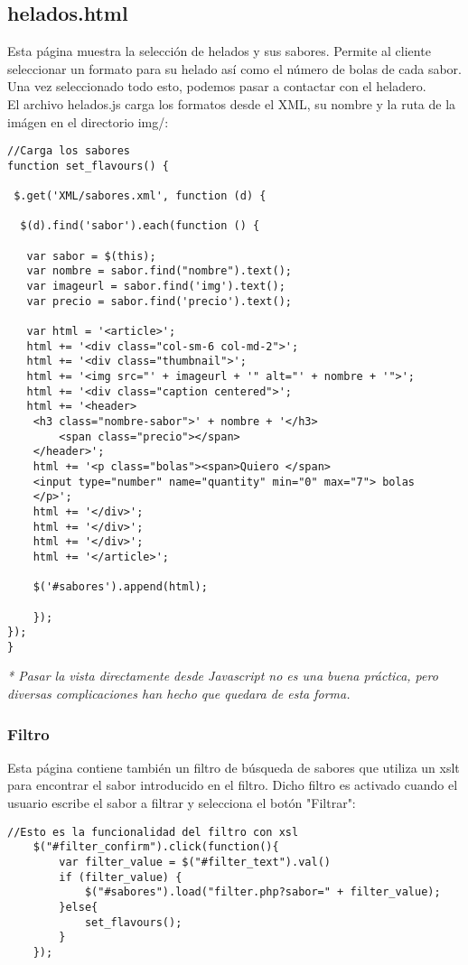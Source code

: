 \documentclass[11pt,a4paper]{article}
\begin{document}
\subsection{helados.html}
Esta página muestra la selección de helados y sus sabores. Permite al cliente seleccionar un formato para su helado así como el número de bolas de cada sabor. Una vez seleccionado todo esto, podemos pasar a contactar con el heladero.\\
El archivo helados.js carga los formatos desde el XML, su nombre y la ruta de la imágen en el directorio img/:\\
\lstset{language=Java}
\begin{lstlisting}
//Carga los sabores
function set_flavours() {

 $.get('XML/sabores.xml', function (d) {

  $(d).find('sabor').each(function () {

   var sabor = $(this);
   var nombre = sabor.find("nombre").text();
   var imageurl = sabor.find('img').text();
   var precio = sabor.find('precio').text();

   var html = '<article>';
   html += '<div class="col-sm-6 col-md-2">';
   html += '<div class="thumbnail">';
   html += '<img src="' + imageurl + '" alt="' + nombre + '">';
   html += '<div class="caption centered">';
   html += '<header>
	<h3 class="nombre-sabor">' + nombre + '</h3>
		<span class="precio"></span>
	</header>';
	html += '<p class="bolas"><span>Quiero </span>
	<input type="number" name="quantity" min="0" max="7"> bolas
	</p>';
	html += '</div>';
	html += '</div>';
	html += '</div>';
	html += '</article>';

	$('#sabores').append(html);

	});
});
}
\end{lstlisting}

\textit{* Pasar la vista directamente desde Javascript no es una buena práctica, pero diversas complicaciones han hecho que quedara de esta forma.}

\subsubsection{Filtro}

Esta página contiene también un filtro de búsqueda de sabores que utiliza un xslt para encontrar el sabor introducido en el filtro. Dicho filtro es activado cuando el usuario escribe el sabor a filtrar y selecciona el botón "Filtrar":
\lstset{language=Java}
\begin{lstlisting}
//Esto es la funcionalidad del filtro con xsl
    $("#filter_confirm").click(function(){
        var filter_value = $("#filter_text").val()
        if (filter_value) {
            $("#sabores").load("filter.php?sabor=" + filter_value);
        }else{
            set_flavours();
        }
    });
\end{lstlisting}
\end{document}
